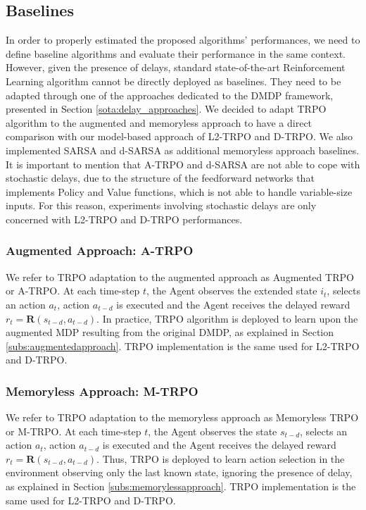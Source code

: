                 
        \subsection{Baselines}
        \label{sub:baselines}
            In order to properly estimated the proposed algorithms' performances, we need to define baseline algorithms and evaluate their performance in the same context. However, given the presence of delays, standard state-of-the-art Reinforcement Learning algorithm cannot be directly deployed as baselines. They need to be adapted through one of the approaches dedicated to the DMDP framework, presented in Section \ref{sota:delay_approaches}. We decided to adapt TRPO algorithm to the augmented and memoryless approach to have a direct comparison with our model-based approach of L2-TRPO and D-TRPO. We also implemented SARSA and d-SARSA as additional memoryless approach baselines. \newline
            It is important to mention that A-TRPO and d-SARSA are not able to cope with stochastic delays, due to the structure of the feedforward networks that implements Policy and Value functions, which is not able to handle variable-size inputs. For this reason, experiments involving stochastic delays are only concerned with L2-TRPO and D-TRPO performances.
            
            \subsubsection{Augmented Approach: A-TRPO}
                We refer to TRPO adaptation to the augmented approach as Augmented TRPO or A-TRPO. At each time-step $t$, the Agent observes the extended state $i_t$, selects an action $a_t$, action $a_{t-d}$ is executed and the Agent receives the delayed reward $r_t = \mathbf{R}(s_{t-d}, a_{t-d})$. In practice, TRPO algorithm is deployed to learn upon the augmented MDP resulting from the original DMDP, as explained in Section \ref{subs:augmentedapproach}. TRPO implementation is the same used for L2-TRPO and D-TRPO.
                
            \subsubsection{Memoryless Approach: M-TRPO}
                We refer to TRPO adaptation to the memoryless approach as Memoryless TRPO or M-TRPO. At each time-step $t$, the Agent observes the state $s_{t-d}$, selects an action $a_t$, action $a_{t-d}$ is executed and the Agent receives the delayed reward $r_t = \mathbf{R}(s_{t-d}, a_{t-d})$. Thus, TRPO is deployed to learn action selection in the environment observing only the last known state, ignoring the presence of delay, as explained in Section \ref{subs:memorylessapproach}. TRPO implementation is the same used for L2-TRPO and D-TRPO.
                
